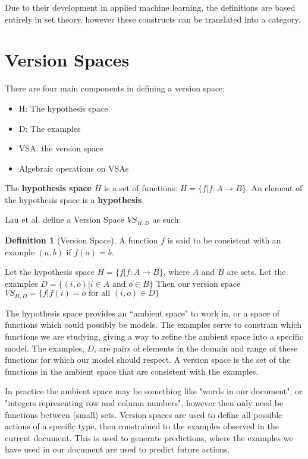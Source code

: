 \documentclass{article}
\theoremstyle{definition}
\newtheorem{definition}{Definition}[section]
\begin{document}
Due to their development in applied machine learning, the definitions are based entirely in set theory, however these constructs can be translated into a category. 

\section{Version Spaces}
There are four main components in defining a version space: 
\begin{itemize}
    \item H: The hypothesis space
    \item D: The examples
    \item VSA: the version space
    \item Algebraic operations on VSAs
\end{itemize}

The \textbf{hypothesis space} $H$ is a set of functions: $H = \{f| f:A\rightarrow B\}$. An element of the hypothesis space is a \textbf{hypothesis}. 

Lau et al.\cite{short}  define a Version Space $VS_{H,D}$ as such: 

\begin{definition}[Version Space] 
A function $f$ is said to be consistent with an example $(a,b)$ if $f(a) = b$. 

Let the hypothesis space $H = \{f | f: A \rightarrow B \}$, where $A$ and $B$ are sets. Let the examples $D = \{(i, o) | i \in A \text{ and } o \in B\}$ Then our version space $VS_{H,D}= \{f | f(i) = o \text{ for all } (i,o) \in D\}$
\end{definition}

The hypothesis space provides an ``ambient space" to work in, or a space of functions which could possibly be models. The examples serve to constrain which functions we are studying, giving a way to refine the ambient space into a specific model.  The examples, $D$, are pairs of elements in the domain and range of these functions for which our model should respect. A version space is the set of the functions in the ambient space that are consistent with the examples. 

In practice the ambient space may be something like "words in our document", or "integers representing row and column numbers", however then only need be functions between (small) sets. Version spaces are used to define all possible actions of a specific type, then constrained to the examples observed in the current document. This is used to generate predictions, where the examples we have used in our document are used to predict future actions.
\end{document}
